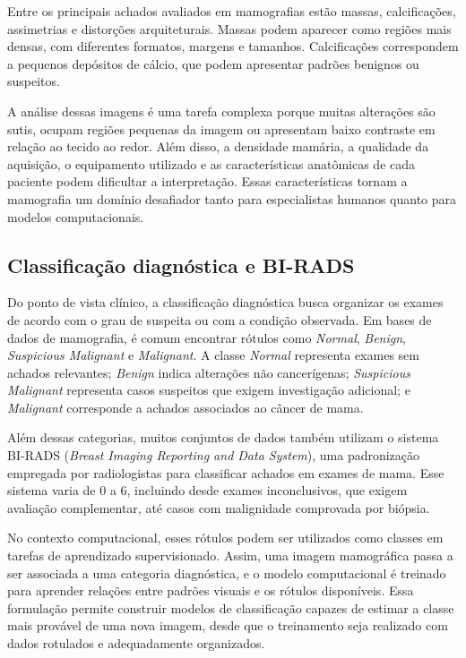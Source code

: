 \documentclass[
    12pt,
    openright,
    oneside,
    a4paper,
    english,
    brazil
]{abntex2}
\begin{document}
Entre os principais achados avaliados em mamografias estão massas, calcificações, assimetrias e distorções arquiteturais. Massas podem aparecer como regiões mais densas, com diferentes formatos, margens e tamanhos. Calcificações correspondem a pequenos depósitos de cálcio, que podem apresentar padrões benignos ou suspeitos. 

A análise dessas imagens é uma tarefa complexa porque muitas alterações são sutis, ocupam regiões pequenas da imagem ou apresentam baixo contraste em relação ao tecido ao redor. Além disso, a densidade mamária, a qualidade da aquisição, o equipamento utilizado e as características anatômicas de cada paciente podem dificultar a interpretação. Essas características tornam a mamografia um domínio desafiador tanto para especialistas humanos quanto para modelos computacionais.

\subsection{Classificação diagnóstica e BI-RADS}

Do ponto de vista clínico, a classificação diagnóstica busca organizar os exames de acordo com o grau de suspeita ou com a condição observada. Em bases de dados de mamografia, é comum encontrar rótulos como \textit{Normal}, \textit{Benign}, \textit{Suspicious Malignant} e \textit{Malignant}. A classe \textit{Normal} representa exames sem achados relevantes; \textit{Benign} indica alterações não cancerígenas; \textit{Suspicious Malignant} representa casos suspeitos que exigem investigação adicional; e \textit{Malignant} corresponde a achados associados ao câncer de mama.

Além dessas categorias, muitos conjuntos de dados também utilizam o sistema BI-RADS (\textit{Breast Imaging Reporting and Data System}), uma padronização empregada por radiologistas para classificar achados em exames de mama. Esse sistema varia de 0 a 6, incluindo desde exames inconclusivos, que exigem avaliação complementar, até casos com malignidade comprovada por biópsia.

No contexto computacional, esses rótulos podem ser utilizados como classes em tarefas de aprendizado supervisionado. Assim, uma imagem mamográfica passa a ser associada a uma categoria diagnóstica, e o modelo computacional é treinado para aprender relações entre padrões visuais e os rótulos disponíveis. Essa formulação permite construir modelos de classificação capazes de estimar a classe mais provável de uma nova imagem, desde que o treinamento seja realizado com dados rotulados e adequadamente organizados.
\end{document}
